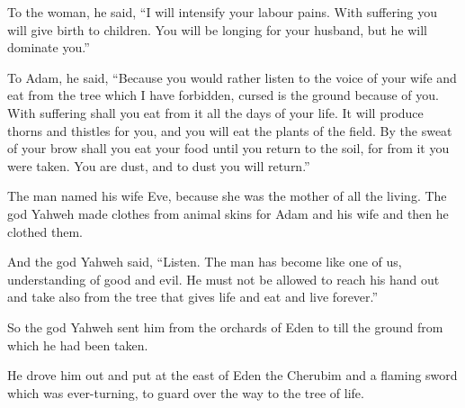 To the woman, he said, 
\enquote{I will intensify your labour pains. 
With suffering you will give birth to children. 
You will be longing for your husband, but he will dominate you.} 

To Adam, he said, 
\enquote{Because you would rather listen to the voice of your wife 
and eat from the tree which I have forbidden, 
cursed is the ground because of you. 
With suffering shall you eat from it all the days of your life. 
It will produce thorns and thistles for you, 
and you will eat the plants of the field. 
By the sweat of your brow shall you eat your food 
until you return to the soil, for from it you were taken. 
You are dust, and to dust you will return.}

The man named his wife Eve, because she was the mother of all the living. 
The god Yahweh made clothes from animal skins for Adam and his wife 
and then he clothed them.

And the god Yahweh said, 
\enquote{Listen. 
The man has become like one of us, 
understanding of good and evil. 
He must not be allowed to reach his hand out 
and take also from the tree that gives life and eat and live forever.}

So the god Yahweh sent him from the orchards of Eden 
to till the ground from which he had been taken.

He drove him out and put at the east of Eden
the Cherubim and a flaming sword which was ever-turning, 
to guard over the way to the tree of life.
